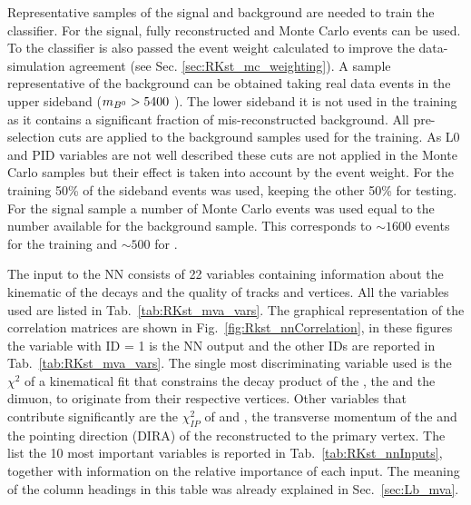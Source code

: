 Representative samples of the signal and background are needed to train the classifier.
For the signal, fully reconstructed \BdToKstmm and \BdKstee Monte Carlo events can be used.
To the classifier is also passed the event weight calculated to improve the data-simulation
agreement (see Sec. \ref{sec:RKst_mc_weighting}).
A sample representative of the background can be obtained taking real data events
in the upper \Bz sideband ($m_{{{B}^0}} > 5400$ \mevcc). The lower sideband it is not
used in the training as it contains a significant fraction of mis-reconstructed background.
All pre-selection cuts are applied to the background samples used for the training.
As L0 and PID variables are not well described these cuts are not applied in the Monte Carlo
samples but their effect is taken into account by the event weight.
For the training 50\% of the sideband events was used, keeping the other 50\% for testing.
For the signal sample a number of Monte Carlo events was used equal to the number available for
the background sample. This corresponds to $\sim 1600$ events for the \mumu training and $\sim 500$ for \ee.

The input to the NN consists of 22 variables containing information about the kinematic of the decays
and the quality of tracks and vertices. All the variables used are listed in Tab.~\ref{tab:RKst_mva_vars}.
%
%
The graphical representation of the correlation matrices are shown in Fig.~\ref{fig:Rkst_nnCorrelation},
in these figures the variable with ID = 1 is the NN output and the other IDs are reported in Tab.~\ref{tab:RKst_mva_vars}.
%
The single most discriminating variable used is the $\chi^2$ of a kinematical fit
that constrains the decay product of the \Bz, the \Kstar and the dimuon, to originate from their respective vertices.
Other variables that contribute significantly are the $\chi^2_{IP}$ of \jpsi and \Kstar, the transverse momentum
of the \Bz and the pointing direction (DIRA) of the reconstructed \Bz to the primary vertex.
The list the 10 most important variables is reported in Tab.~\ref{tab:RKst_nnInputs}, together
with information on the relative importance of each input. The meaning of the column headings
in this table was already explained in Sec.~\ref{sec:Lb_mva}.

